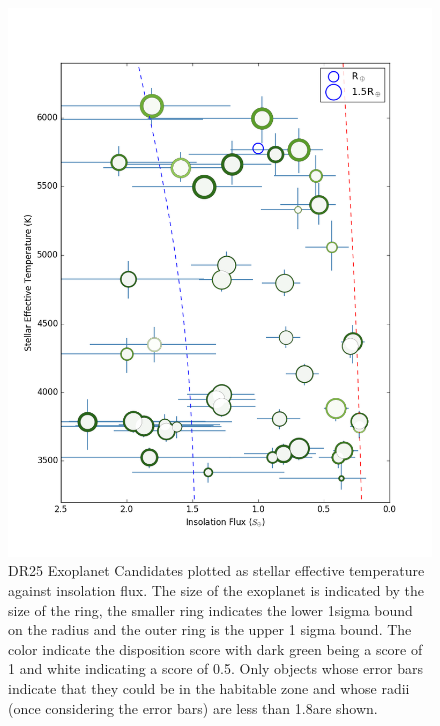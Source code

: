 \begin{figure}
    \centering
    \includegraphics[width=1.1\linewidth]{fig-hzTstarInsol.png}
    \caption{DR25 Exoplanet Candidates plotted as stellar effective temperature against insolation flux. The size of the exoplanet is indicated by the size of the ring, the smaller ring indicates the lower 1sigma bound on the radius and the outer ring is the upper 1 sigma bound.  The color indicate the disposition score with dark green being a score of 1 and white indicating a score of 0.5. Only objects whose error bars indicate that they could be in the habitable zone and whose radii (once considering the error bars) are less than 1.8\re are shown. }
    \label{f:hzNarrow}
\end{figure}


